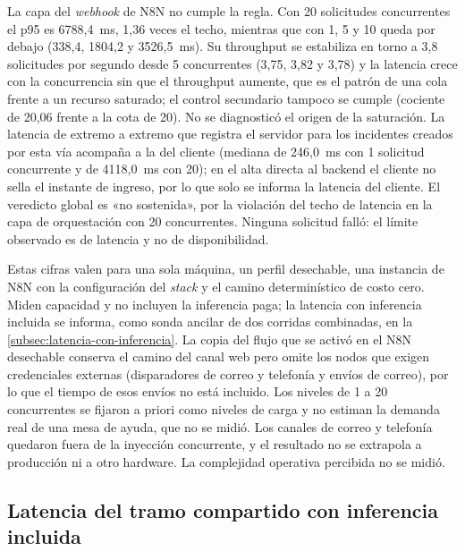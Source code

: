 La capa del \emph{webhook} de N8N no cumple la regla. Con 20 solicitudes concurrentes el p95 es 6788,4~ms, 1,36 veces el techo, mientras que con 1, 5 y 10 queda por debajo (338,4, 1804,2 y 3526,5~ms). Su throughput se estabiliza en torno a 3,8 solicitudes por segundo desde 5 concurrentes (3,75, 3,82 y 3,78) y la latencia crece con la concurrencia sin que el throughput aumente, que es el patrón de una cola frente a un recurso saturado; el control secundario tampoco se cumple (cociente de 20,06 frente a la cota de 20). No se diagnosticó el origen de la saturación. La latencia de extremo a extremo que registra el servidor para los incidentes creados por esta vía acompaña a la del cliente (mediana de 246,0~ms con 1 solicitud concurrente y de 4118,0~ms con 20); en el alta directa al backend el cliente no sella el instante de ingreso, por lo que solo se informa la latencia del cliente. El veredicto global es «no sostenida», por la violación del techo de latencia en la capa de orquestación con 20 concurrentes. Ninguna solicitud falló: el límite observado es de latencia y no de disponibilidad.

Estas cifras valen para una sola máquina, un perfil desechable, una instancia de N8N con la configuración del \emph{stack} y el camino determinístico de costo cero. Miden capacidad y no incluyen la inferencia paga; la latencia con inferencia incluida se informa, como sonda ancilar de dos corridas combinadas, en la \autoref{subsec:latencia-con-inferencia}. La copia del flujo que se activó en el N8N desechable conserva el camino del canal web pero omite los nodos que exigen credenciales externas (disparadores de correo y telefonía y envíos de correo), por lo que el tiempo de esos envíos no está incluido. Los niveles de 1 a 20 concurrentes se fijaron a priori como niveles de carga y no estiman la demanda real de una mesa de ayuda, que no se midió. Los canales de correo y telefonía quedaron fuera de la inyección concurrente, y el resultado no se extrapola a producción ni a otro hardware. La complejidad operativa percibida no se midió.

\subsection{Latencia del tramo compartido con inferencia incluida}\label{subsec:latencia-con-inferencia}


